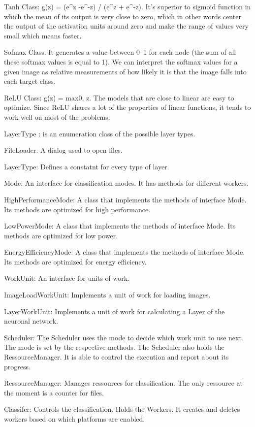 \documentclass[parskip=full]{scrartcl}
\begin{document}
Tanh Class: g(z) = (e^z -e^{-z}) / (e^z + e^{-z}). It’s superior to sigmoid function in which the mean of its output is very close to zero, which in other words center the output of the activation units around zero and make the range of values very small which means faster.

Sofmax Class: It generates a value between 0–1 for each node (the sum of all these softmax values is equal to 1). We can interpret the softmax values for a given image as relative measurements of how likely it is that the image falls into each target class.

ReLU Class:  g(z) = max{0, z}. The models that are close to linear are easy to optimize. Since ReLU shares a lot of the properties of linear functions, it tends to work well on most of the problems.

LayerType : is an enumeration class of the possible layer types.




FileLoader: A dialog used to open files.

LayerType: Defines a constatnt for every type of layer.

Mode: An interface for classification modes. It has methods for different workers.

HighPerformanceMode: A class that implements the methods of interface Mode. Its methods are optimized for high performance.

LowPowerMode: A class that implements the methods of interface Mode. Its methods are optimized for low power.

EnergyEfficiencyMode: A class that implements the methods of interface Mode. Its methods are optimized for energy efficiency.

WorkUnit: An interface for units of work.

ImageLoadWorkUnit: Implements a unit of work for loading images.

LayerWorkUnit: Implements a unit of work for calculating a Layer of the neuronal network.

Scheduler: The Scheduler uses the mode to decide which work unit to use next. The mode is set by the respective methods. The Scheduler also holds the RessourceManager. It is able to control the execution and report about its progress.

RessourceManager: Manages ressources for classification. The only ressource at the moment is a counter for files.

Classifer: Controls the classification. Holds the Workers. It creates and deletes workers based on which platforms are enabled.
\end{document}
